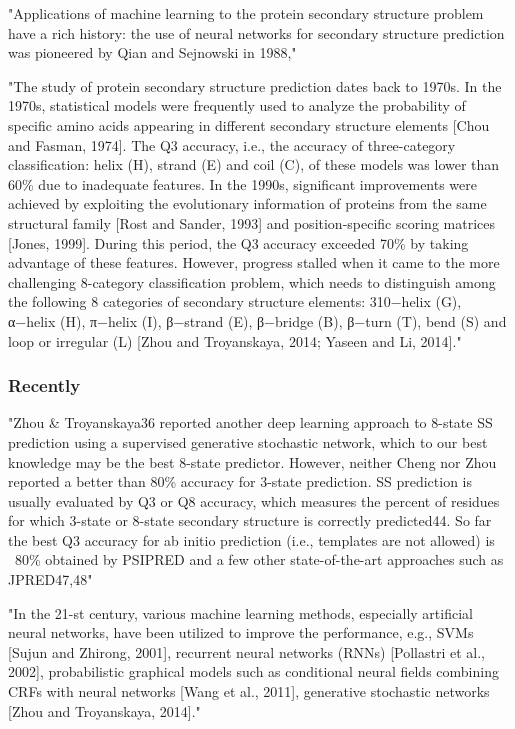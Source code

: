 	"Applications of machine learning to the protein secondary structure problem have a rich history: the use of neural networks for secondary structure prediction was pioneered by Qian and Sejnowski in 1988," \cite{Busia2017}
	
	"The study of protein secondary structure prediction dates back to 1970s. In the 1970s, statistical models were frequently used to analyze the probability of specific amino acids appearing in different secondary structure elements [Chou and Fasman, 1974]. The Q3 accuracy, i.e., the accuracy of three-category classification: helix (H), strand (E) and coil (C), of these models was lower than 60\% due to inadequate features. In the 1990s, significant improvements were achieved by exploiting the evolutionary information of proteins from the same structural family [Rost and Sander, 1993] and position-specific scoring matrices [Jones, 1999]. During this period, the Q3 accuracy exceeded 70\% by taking advantage of these features. However, progress stalled when it came to the more challenging 8-category classification problem, which needs to distinguish among the following 8 categories of secondary structure elements: 310−helix (G), α−helix (H), π−helix (I), β−strand (E), β−bridge (B), β−turn (T), bend (S) and loop or irregular (L) [Zhou and Troyanskaya, 2014; Yaseen and Li, 2014]." \cite{Li2016}

	\subsubsection{Recently}
	"Zhou \& Troyanskaya36 reported another deep learning approach to 8-state SS prediction using a supervised generative stochastic network, which to our best knowledge may be the best 8-state predictor. However, neither Cheng nor Zhou reported a better than 80\% accuracy for 3-state prediction. SS prediction is usually evaluated by Q3 or Q8 accuracy, which measures the percent of residues for which 3-state or 8-state secondary structure is correctly predicted44. So far the best Q3 accuracy for ab initio prediction (i.e., templates are not allowed) is ~80\% obtained by PSIPRED and a few other state-of-the-art approaches such as JPRED47,48" \cite{Wang2016}
	
	"In the 21-st century, various machine learning methods, especially artificial neural networks, have been utilized to improve the performance, e.g., SVMs [Sujun and Zhirong, 2001], recurrent neural networks (RNNs) [Pollastri et al., 2002], probabilistic graphical models such as conditional neural fields combining CRFs with neural networks [Wang et al., 2011], generative stochastic networks [Zhou and Troyanskaya, 2014]." \cite{Li2016}

